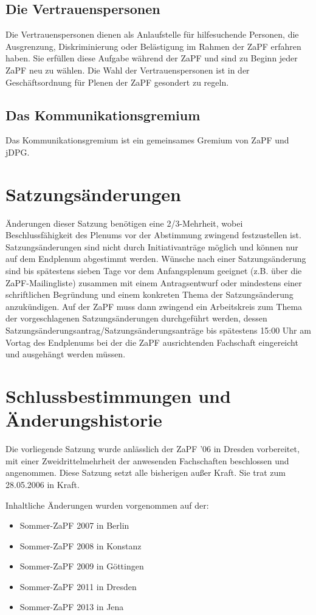 \documentclass[draft,12pt,oneside]{scrreprt}
\begin{document}
\subsection{Die Vertrauenspersonen}

          Die Vertrauenspersonen dienen als Anlaufstelle für hilfesuchende Personen,
          die Ausgrenzung, Diskriminierung oder Belästigung im Rahmen der ZaPF
          erfahren haben. Sie erfüllen diese Aufgabe während der ZaPF und sind
          zu Beginn jeder ZaPF neu zu wählen.
          Die Wahl der Vertrauenspersonen ist in der Geschäftsordnung für Plenen
          der ZaPF gesondert zu regeln.

\subsection{Das Kommunikationsgremium}

          Das Kommunikationsgremium ist ein gemeinsames Gremium von ZaPF und
          jDPG.


\section{Satzungsänderungen}
Änderungen dieser Satzung benötigen eine 2/3-Mehrheit, wobei Beschlussfähigkeit
des Plenums vor der Abstimmung zwingend festzustellen ist. Satzungsänderungen
sind nicht durch Initiativanträge möglich und können nur auf dem Endplenum
abgestimmt werden. Wünsche nach einer Satzungsänderung sind bis spätestens
sieben Tage vor dem Anfangsplenum geeignet (z.B. über die ZaPF-Mailingliste)
zusammen mit einem Antragsentwurf oder mindestens einer schriftlichen
Begründung und einem konkreten Thema der Satzungsänderung anzukündigen. Auf der
ZaPF muss dann zwingend ein Arbeitskreis zum Thema der vorgeschlagenen
Satzungsänderungen durchgeführt werden, dessen
Satzungsänderungsantrag/Satzungsänderungsanträge bis spätestens 15:00 Uhr am
Vortag des Endplenums bei der die ZaPF ausrichtenden Fachschaft eingereicht und
ausgehängt werden müssen.

\section*{Schlussbestimmungen und Änderungshistorie}
Die vorliegende Satzung wurde anlässlich der ZaPF '06 in Dresden vorbereitet,
mit einer Zweidrittelmehrheit der anwesenden Fachschaften beschlossen und
angenommen. Diese Satzung setzt alle bisherigen außer Kraft. Sie trat zum
28.05.2006 in Kraft.

Inhaltliche Änderungen wurden vorgenommen auf der:

\begin{itemize}

  \item Sommer-ZaPF 2007 in Berlin

  \item Sommer-ZaPF 2008 in Konstanz

  \item Sommer-ZaPF 2009 in Göttingen

  \item Sommer-ZaPF 2011 in Dresden

  \item Sommer-ZaPF 2013 in Jena

\end{itemize}
\end{document}
